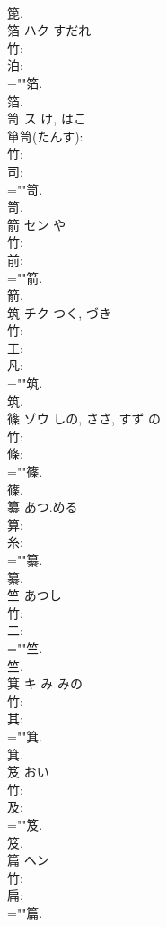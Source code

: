 \documentclass[8pt]{extreport}
\begin{document}
\begin{CJK}{UTF8}{min}
\\	箆.
\\	箔	ハク	すだれ		
\\	竹: 
\\	泊: 
\\	=""箔.
\\	箔.
\\	笥	ス	け, はこ		
\\	箪笥(たんす): 
\\	竹: 
\\	司: 
\\	=""笥.
\\	笥.
\\	箭	セン	や		
\\	竹: 
\\	前: 
\\	=""箭.
\\	箭.
\\	筑	チク		つく, づき	
\\	竹: 
\\	工: 
\\	凡: 
\\	=""筑.
\\	筑.
\\	篠	ゾウ	しの, ささ, すず	の	
\\	竹: 
\\	條: 
\\	=""篠.
\\	篠.
\\	纂		あつ.める				
\\	算: 
\\	糸: 
\\	=""纂.
\\	纂.
\\	竺			あつし			
\\	竹: 
\\	二: 
\\	=""竺.
\\	竺.
\\	箕	キ	み	みの	
\\	竹: 
\\	其: 
\\	=""箕.
\\	箕.
\\	笈			おい			
\\	竹: 
\\	及: 
\\	=""笈.
\\	笈.
\\	篇	ヘン			
\\	竹: 
\\	扁: 
\\	=""篇.

\end{CJK}
\end{document}
